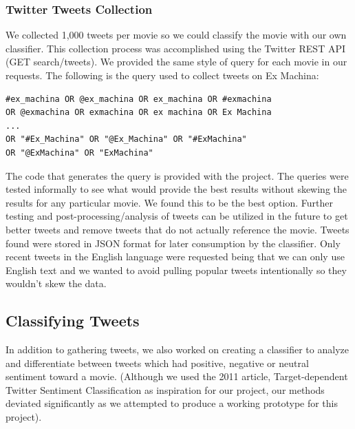 \documentclass[12pt]{article}
\begin{document}
\subsubsection{Twitter Tweets Collection}
We collected 1,000 tweets per movie so we could classify the movie with our own classifier. This collection process was accomplished using the Twitter REST API (GET search/tweets). We provided the same style of query for each movie in our requests. The following is the query used to collect tweets on Ex Machina:
\begin{verbatim}
#ex_machina OR @ex_machina OR ex_machina OR #exmachina 
OR @exmachina OR exmachina OR ex machina OR Ex Machina 
...
OR "#Ex_Machina" OR "@Ex_Machina" OR "#ExMachina" 
OR "@ExMachina" OR "ExMachina"
\end{verbatim}
The code that generates the query is provided with the project. The queries were tested informally to see what would provide the best results without skewing the results for any particular movie. We found this to be the best option. Further testing and post-processing/analysis of tweets can be utilized in the future to get better tweets and remove tweets that do not actually reference the movie.
Tweets found were stored in JSON format for later consumption by the classifier.
Only recent tweets in the English language were requested being that we can only use English text and we wanted to avoid pulling popular tweets intentionally so they wouldn't skew the data.
\subsection{Classifying Tweets}\label{S:3}
In addition to gathering tweets, we also worked on creating a classifier to analyze and differentiate between tweets which had positive, negative or neutral sentiment toward a movie. (Although we used the 2011 article, Target-dependent Twitter Sentiment Classification \cite{TwitterSentiment:2011} as inspiration for our project, our methods deviated significantly as we attempted to produce a working prototype for this project).
\end{document}
